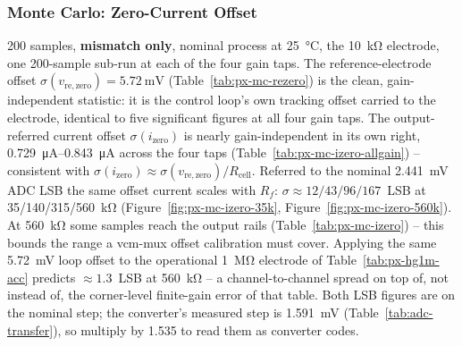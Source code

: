 %

\subsubsection{Monte Carlo: Zero-Current Offset}\label{sss:pixel-mc}

200 samples, \textbf{mismatch only}, nominal process at \SI{25}{\celsius}, the
\SI{10}{\kilo\ohm} electrode, one 200-sample sub-run at each of the four gain
taps. The reference-electrode offset $\sigma(v_{\mathrm{re,zero}}) =
\SI{5.72}{\milli\volt}$ (Table~\ref{tab:px-mc-rezero}) is the clean,
gain-independent statistic: it is the control loop's own tracking offset
carried to the electrode, identical to five significant figures at all four
gain taps. The output-referred current offset $\sigma(i_{\mathrm{zero}})$ is
nearly gain-independent in its own right, \SIrange{0.729}{0.843}{\micro\ampere}
across the four taps (Table~\ref{tab:px-mc-izero-allgain}) -- consistent with
$\sigma(i_{\mathrm{zero}}) \approx \sigma(v_{\mathrm{re,zero}})/R_{\mathrm{cell}}$.
Referred to the nominal \SI{2.441}{\milli\volt} ADC LSB the same offset
current scales with $R_f$: $\sigma
\approx 12/43/96/167$~LSB at 35/140/315/\SI{560}{\kilo\ohm}
(Figure~\ref{fig:px-mc-izero-35k}, Figure~\ref{fig:px-mc-izero-560k}). At
\SI{560}{\kilo\ohm} some samples reach the output rails
(Table~\ref{tab:px-mc-izero}) -- this bounds the range a vcm-mux offset
calibration must cover. Applying the same \SI{5.72}{\milli\volt} loop offset
to the operational \SI{1}{\mega\ohm} electrode of
Table~\ref{tab:px-hg1m-acc} predicts $\approx 1.3$~LSB at
\SI{560}{\kilo\ohm} -- a channel-to-channel spread on top of, not instead of,
the corner-level finite-gain error of that table. Both LSB figures are on the
nominal step; the converter's measured step is \SI{1.591}{\milli\volt}
(Table~\ref{tab:adc-transfer}), so multiply by \num{1.535} to read them as
converter codes.
